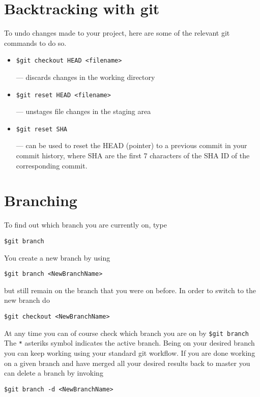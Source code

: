 \documentclass{article}
\begin{document}
\section{Backtracking with git}
To undo changes made to your project, here are some of the relevant git commands to do so.
\begin{itemize}

\item
\begin{lstlisting}
$git checkout HEAD <filename>
\end{lstlisting} --- discards changes in the working directory

\item 
\begin{lstlisting}
$git reset HEAD <filename>
\end{lstlisting}
--- unstages file changes in the staging area

\item 
\begin{lstlisting}
$git reset SHA
\end{lstlisting}
 --- can be used to reset the HEAD (pointer) to a previous commit in your commit history, where SHA are the first 7 characters of the SHA ID of the corresponding commit.
\end{itemize}


\section{Branching}

To find out which branch you are currently on, type
\begin{lstlisting}
$git branch
\end{lstlisting}
You create a new branch by using
\begin{lstlisting}
$git branch <NewBranchName>
\end{lstlisting}
but still remain on the branch that you were on before. In order to switch to the new branch do
\begin{lstlisting}
$git checkout <NewBranchName>
\end{lstlisting}
At any time you can of course check which branch you are on by \verb|$git branch| The \verb|*| asteriks symbol indicates the active branch.
Being on your desired branch you can keep working using your standard git workflow.
If you are done working on a given branch and have merged all your desired results back to master you can delete a branch by invoking
\begin{lstlisting}
$git branch -d <NewBranchName>
\end{lstlisting}
\end{document}
